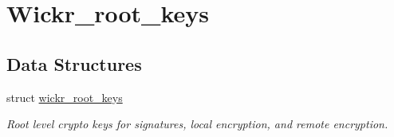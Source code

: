 \hypertarget{group__wickr__root__keys}{}\section{Wickr\+\_\+root\+\_\+keys}
\label{group__wickr__root__keys}
\subsection*{Data Structures}
\begin{DoxyCompactItemize}
\item 
struct \hyperlink{structwickr__root__keys}{wickr\+\_\+root\+\_\+keys}
\begin{DoxyCompactList}\small\item\em Root level crypto keys for signatures, local encryption, and remote encryption. \end{DoxyCompactList}\end{DoxyCompactItemize}

